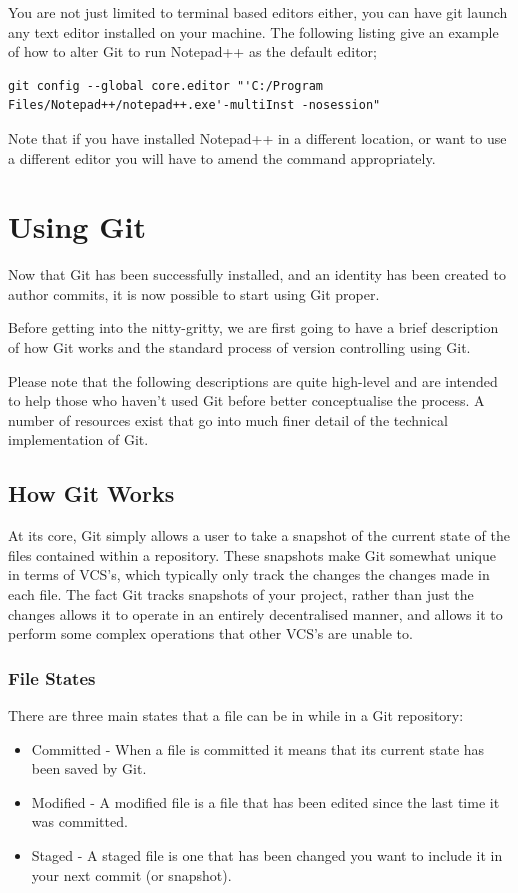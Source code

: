 \documentclass[11pt, a4paper, titlepage]{article}
\begin{document}
You are not just limited to terminal based editors either, you can have git
launch any text editor installed on your machine.
The following listing give an example of how to alter Git to run  Notepad++ as
the default editor;

\begin{lstlisting}[label=lst_config_note,
caption=Updating the defualt Git editor to Notepad++]
 git config --global core.editor "'C:/Program Files/Notepad++/notepad++.exe'-multiInst -nosession" 
\end{lstlisting}

Note that if you have installed Notepad++ in a different location, or want to
use a different editor you will have to amend the command appropriately.



\section{Using Git}
Now that Git has been successfully installed, and an identity has been created
to author commits, it is now possible to start using Git proper.

Before getting into the nitty-gritty, we are first going to have a brief
description of how Git works and the standard process of version controlling
using Git. 

Please note that the following descriptions are quite high-level and are
intended to help those who haven't used Git before better conceptualise the
process. A number of resources exist that go into much finer detail of the
technical implementation of Git.

\subsection{How Git Works}
At its core, Git simply allows a user to take a snapshot of the current state
of the files contained within a repository.
These snapshots make Git somewhat unique in terms of VCS's, which typically
only track the changes the changes made in each file.
The fact Git tracks snapshots of your project, rather than just the changes
allows it to operate in an entirely decentralised manner, and allows it to
perform some complex operations that other VCS's are unable to.

\subsubsection{File States}
There are three main states that a file can be in while in a Git repository:
\begin{itemize}
\item Committed - When a file is committed it means that its current state has
been saved by Git.
\item Modified - A modified file is a file that has been edited since the
last time it was committed.
\item Staged - A staged file is one that has been changed you want to include
it in your next commit (or snapshot).
\end{itemize}
\end{document}
